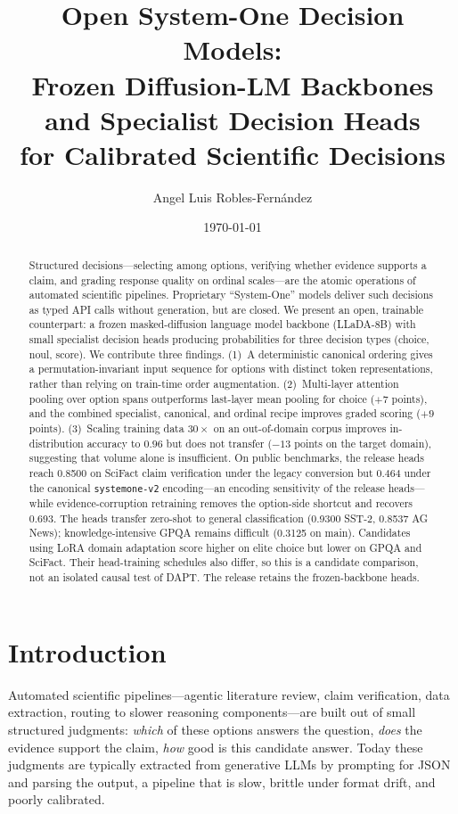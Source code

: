 \documentclass[11pt]{article}
\title{Open System-One Decision Models:\\
Frozen Diffusion-LM Backbones and Specialist Decision Heads\\
for Calibrated Scientific Decisions}
\author[1]{Angel Luis Robles-Fern\'andez}
\affil[1]{Kansas Biological Survey, University of Kansas, Lawrence, KS, USA; \texttt{a.l.robles.fernandez@gmail.com}}
\date{\today}
\begin{document}
\maketitle

\begin{abstract}
Structured decisions---selecting among options, verifying whether evidence
supports a claim, and grading response quality on ordinal scales---are the
atomic operations of automated scientific pipelines. Proprietary
``System-One'' models deliver such decisions as typed API calls without
generation, but are closed. We present an open, trainable counterpart: a
frozen masked-diffusion language model backbone (LLaDA-8B) with small
specialist decision heads producing probabilities for three decision types
(choice, noul, score). We contribute three findings. (1)~A deterministic
canonical ordering gives a permutation-invariant input sequence for
options with distinct token representations, rather than relying on
train-time order augmentation. (2)~Multi-layer attention pooling over
option spans outperforms last-layer mean pooling for choice ($+7$ points),
and the combined specialist, canonical, and ordinal recipe improves graded
scoring ($+9$ points).
(3)~Scaling training data $30\times$ on an out-of-domain corpus improves
in-distribution accuracy to $0.96$ but does not transfer ($-13$ points on
the target domain), suggesting that volume alone is insufficient. On
public benchmarks, the release heads reach 0.8500 on SciFact claim
verification under the legacy conversion but 0.464 under the canonical
\texttt{systemone-v2} encoding---an encoding sensitivity of the release
heads---while evidence-corruption retraining removes the option-side
shortcut and recovers 0.693. The heads transfer zero-shot to general classification
(0.9300 SST-2, 0.8537 AG News); knowledge-intensive GPQA remains
difficult (0.3125 on main).
Candidates using LoRA domain adaptation score higher on elite choice
but lower on GPQA and SciFact. Their head-training schedules also differ,
so this is a candidate comparison, not an isolated causal test of DAPT.
The release retains the frozen-backbone heads.
\end{abstract}

\section{Introduction}

Automated scientific pipelines---agentic literature review, claim
verification, data extraction, routing to slower reasoning
components---are built out of small structured judgments: \emph{which}
of these options answers the question, \emph{does} the evidence support
the claim, \emph{how} good is this candidate answer. Today these
judgments are typically extracted from generative LLMs by prompting for
JSON and parsing the output, a pipeline that is slow, brittle under
format drift, and poorly calibrated.
\end{document}
